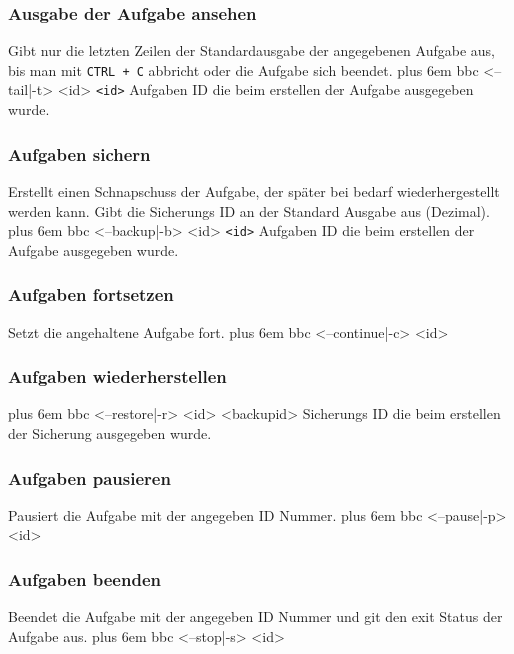 \documentclass[a4paper,12pt]{article}
\makeatletter
\newenvironment{mycode}
 {\def\@xobeysp{\ }\verbatim\rightskip=0pt plus 6em\relax}
 {\endverbatim}
\makeatother
\begin{document}
\subsubsection{Ausgabe der Aufgabe ansehen}
Gibt nur die letzten Zeilen der Standardausgabe der angegebenen Aufgabe aus, bis man mit \texttt{CTRL + C} abbricht oder die Aufgabe sich beendet.
\begin{mycode}
bbc <--tail|-t> <id>
\end{mycode}
\texttt{<id>} Aufgaben ID die beim erstellen der Aufgabe ausgegeben wurde.

\subsubsection{Aufgaben sichern}
Erstellt einen Schnapschuss der Aufgabe, der später bei bedarf wiederhergestellt werden kann.
Gibt die Sicherungs ID an der Standard Ausgabe aus (Dezimal).
\begin{mycode}
bbc <--backup|-b> <id>
\end{mycode}
\texttt{<id>} Aufgaben ID die beim erstellen der Aufgabe ausgegeben wurde.

\subsubsection{Aufgaben fortsetzen}
Setzt die angehaltene Aufgabe fort.
\begin{mycode}
bbc <--continue|-c> <id>
\end{mycode}

\subsubsection{Aufgaben wiederherstellen}
\begin{mycode}
bbc <--restore|-r> <id> <backupid>
\end{mycode}
Sicherungs ID die beim erstellen der Sicherung ausgegeben wurde.

\subsubsection{Aufgaben pausieren}
Pausiert die Aufgabe mit der angegeben ID Nummer.
\begin{mycode}
bbc <--pause|-p> <id>
\end{mycode}

\subsubsection{Aufgaben beenden}
Beendet die Aufgabe mit der angegeben ID Nummer und git den exit Status der Aufgabe aus.
\begin{mycode}
bbc <--stop|-s> <id>
\end{mycode}
\end{document}
